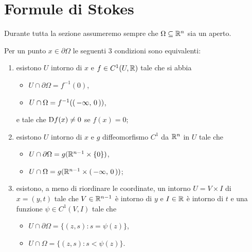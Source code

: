 \section{Formule di Stokes}\label{sezione:FormuleStokes}

Durante tutta la sezione assumeremo sempre che $\Omega\subseteq\mathbb R^n$ sia un aperto.

\begin{theorem}\label{thm:PtRegEquiv}
	Per un punto $x\in \partial \Omega$ le seguenti $3$ condizioni sono equivalenti:
	\begin{enumerate}
		\item esistono $U$ intorno di $x$ e $f\in C^1(U,\mathbb R)$ tale che si abbia
			\begin{itemize}
				\item $U\cap \partial \Omega=f^{-1}(0)$,
				\item $U\cap \Omega=f^{-1}(\left(\,-\infty,\,0\,\right))$,
			\end{itemize}
			e tale che $\mathrm D f(x)\neq 0$ se $f(x)=0$;\label{PRE:i}
		\item esistono $U$ intorno di $x$ e $g$ diffeomorfismo $C^1$ da $\mathbb R^n$ in $U$ tale che\label{PRE:ii}
			\begin{itemize}
				\item $U\cap \partial \Omega = g(\mathbb R^{n-1}\times\{0\})$,
				\item $U\cap \Omega = g(\mathbb R^{n-1}\times\left(\,-\infty,\,0\,\right))$;
			\end{itemize}
		\item esistono, a meno di riordinare le coordinate, un intorno $U=V\times I$ di $x=(y,t)$ tale che $V\in\mathbb R^{n-1}$ è intorno di $y$
			e $I\in\mathbb R$ è intorno di $t$ e una funzione $\psi\in C^1(V,I)$ tale che
			\begin{itemize}
				\item $U\cap \partial \Omega = \{(z,s):s=\psi(z)\}$,
				\item $U\cap \Omega = \{(z,s):s<\psi(z)\}$.
			\end{itemize}\label{PRE:iii}
	\end{enumerate}
\end{theorem}

